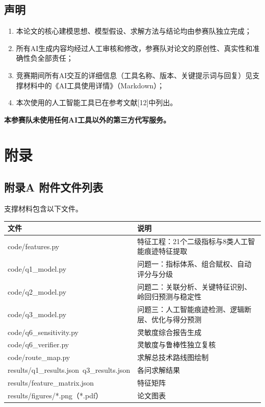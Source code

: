 \documentclass[withoutpreface]{cumcmthesis}
\begin{document}
\subsection{声明}
\begin{enumerate}
  \item 本论文的核心建模思想、模型假设、求解方法与结论均由参赛队独立完成；
  \item 所有AI生成内容均经过人工审核和修改，参赛队对论文的原创性、真实性和准确性负全部责任；
  \item 竞赛期间所有AI交互的详细信息（工具名称、版本、关键提示词与回复）见支撑材料中的《AI工具使用详情》（Markdown）；
  \item 本次使用的人工智能工具已在参考文献[12]中列出。
\end{enumerate}
\textbf{本参赛队未使用任何AI工具以外的第三方代写服务。}

\section{附录}
\subsection{附录A 附件文件列表}
支撑材料包含以下文件。

\begin{table}[htbp]
\centering
\small
\begin{tabularx}{\textwidth}{XX}
\toprule
文件 & 说明 \\
\midrule
code/features.py & 特征工程：21个二级指标与8类人工智能痕迹特征提取 \\
code/q1\_model.py & 问题一：指标体系、组合赋权、自动评分与分级 \\
code/q2\_model.py & 问题二：关联分析、关键特征识别、岭回归预测与稳定性 \\
code/q3\_model.py & 问题三：人工智能痕迹检测、逻辑断层、优化与得分预测 \\
code/q6\_sensitivity.py & 灵敏度综合报告生成 \\
code/q6\_verifier.py & 灵敏度与鲁棒性独立复核 \\
code/route\_map.py & 求解总技术路线图绘制 \\
results/q1\_results.json~q3\_results.json & 各问求解结果 \\
results/feature\_matrix.json & 特征矩阵 \\
results/figures/*.png（*.pdf） & 论文图表 \\
\bottomrule
\end{tabularx}
\end{table}
\end{document}
